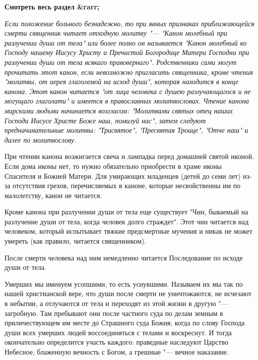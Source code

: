 


\bfseries Смотреть весь раздел &rarr;\normalfont{} 

 


\itshape Если положение больного безнадежно, то при явных признаках приближающейся смерти священник читает отходную молитву "--- "Канон молебный при разлучении души от тела" или более полно он называется "Канон молебный ко Господу нашему Иисусу Христу и Пречистой Богородице Матери Господни при разлучении души от тела всякаго правовернаго". Родственники сами могут прочитать этот канон, если невозможно пригласить священника, кроме чтения "молитвы, от иерея глаголемой на исход души", которая находится в конце канона. Этот канон читается "от лица человека с душею разлучающагося и не могущаго глаголати" и имеется в православных молитвословах. Чтение канона мирскими людьми начинается возгласом: "Молитвами святых отец наших Господи Иисусе Христе Боже наш, помилуй нас", затем следуют предначинательные молитвы: "Трисвятое", "Пресвятая Троице", "Отче наш" и далее по молитвослову. 

При чтении канона возжигается свеча и лампадка перед домашней святой иконой. Если дома иконы нет, то нужно обязательно приобрести в храме иконы Спасителя и Божией Матери. Для умирающих младенцев (детей до семи лет) из-за отсутствия грехов, перечисляемых в каноне, которые несвойственны им по малолетству, канон не читается. 

Кроме канона при разлучении души от тела еще существует "Чин, бываемый на разлучение души от тела, когда человек долго страждет". Этот чин читается над человеком, который испытывает тяжкие предсмертные мучения и никак не может умереть (как правило, читается священником). 

После смерти человека над ним немедленно читается Последование по исходе души от тела. 

\normalfont{} 


\mychapterending

 


Умерших мы именуем усопшими, то есть уснувшими. Называем их мы так по нашей христианской вере, что души после смерти не уничтожаются, не исчезают в небытии, а отлучаются от тела и переходят из этой жизни в другую "--- загробную. Там пребывают они после частного суда по делам земным в приличествующем им месте до Страшного суда Божия, когда по слову Господа души всех умерших людей воссоединяться с телами и воскреснут. И тогда окончательно определится участь каждого: праведные наследуют Царство Небесное, блаженную вечность с Богом, а грешные "--- вечное наказание. 

